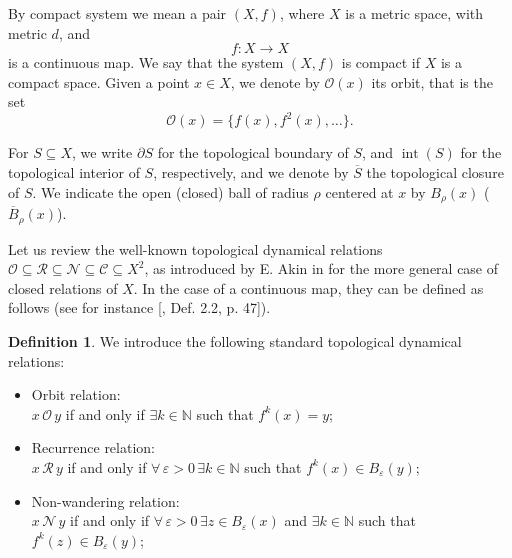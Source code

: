 \documentclass[10pt,a4paper]{article}
\theoremstyle{definition}
\newtheorem{defi}{Definition}[section]
\theoremstyle{remark}
\theoremstyle{plain}
\begin{document}
By compact system we mean a pair $(X,f)$, where $X$ is a metric space, with metric $d$, and
$$f:X\longrightarrow X$$
is a continuous map. We say that the system $(X,f)$ is compact if $X$ is a compact space. Given a point $x\in X$, we denote by $\mathcal{O}(x)$ its orbit, that is the set
$$\mathcal{O}(x)=\{f(x),f^2(x),\dots\}.$$

For $S\subseteq X$, we write $\partial S$ for the topological boundary of $S$, and $\operatorname{int}(S)$ for the topological interior of $S$, respectively, and we denote by $\overline{S}$ the topological closure of $S$. We indicate the open (closed) ball of radius $\rho$ centered at $x$ by $B_\rho(x)$ ($\overline{B}_\rho(x)$).


Let us review the well-known topological dynamical relations $\mathcal{O}\subseteq\mathcal{R}\subseteq\mathcal{N}\subseteq\mathcal{C}\subseteq X^2$, as introduced by E. Akin in \cite{Akin} for the more general case of closed relations of $X$. In the case of a continuous map, they can be defined as follows (see for instance [\cite{kurka03}, Def. 2.2, p. 47]).

\begin{defi}   
\mbox{}
We introduce the following standard topological dynamical relations:

    \begin{itemize}
        \item[1)] Orbit relation:\\ $x\,\mathcal{O}\,y$ if and only if $\exists k\in\mathbb{N}$ such that $f^k(x)=y$;
        \item[2)] Recurrence relation:\\$x\,\mathcal{R}\,y$ if and only if $\forall\,\varepsilon>0\, \exists k\in\mathbb{N}$ such that $f^k(x)\in B_\varepsilon (y)$;
        \item[3)] Non-wandering relation:\\ $x\,\mathcal{N}\,y$ if and only if $\forall\,\varepsilon>0\, \exists z\in B_\varepsilon (x)$ and $\exists k\in\mathbb{N}$ such that $f^k(z)\in B_\varepsilon (y)$;
    \end{itemize}
\end{defi}
\end{document}
